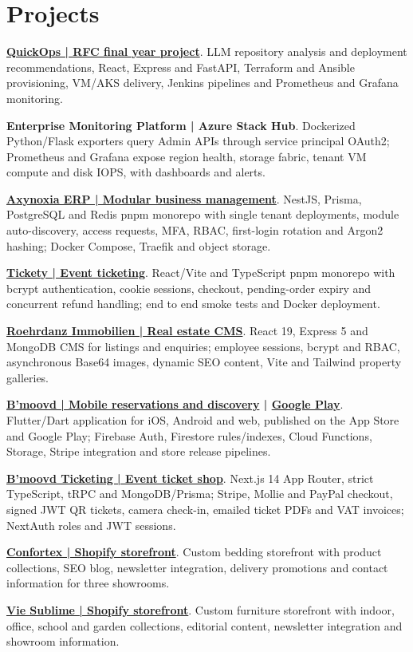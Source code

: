\documentclass[11pt,a4paper]{article}
\newcommand{\project}[2]{\Needspace{3\baselineskip}\textbf{#1}. #2\par}
\begin{document}
\section{Projects}
\project{\href{https://github.com/tamim-hmizi/QuickOps-AI}{QuickOps | RFC final year project}}{LLM repository analysis and deployment recommendations, React, Express and FastAPI, Terraform and Ansible provisioning, VM/AKS delivery, Jenkins pipelines and Prometheus and Grafana monitoring.}
\project{Enterprise Monitoring Platform | Azure Stack Hub}{Dockerized Python/Flask exporters query Admin APIs through service principal OAuth2; Prometheus and Grafana expose region health, storage fabric, tenant VM compute and disk IOPS, with dashboards and alerts.}
\project{\href{https://erp.products.axynoxia.com}{Axynoxia ERP | Modular business management}}{NestJS, Prisma, PostgreSQL and Redis pnpm monorepo with single tenant deployments, module auto-discovery, access requests, MFA, RBAC, first-login rotation and Argon2 hashing; Docker Compose, Traefik and object storage.}
\project{\href{https://tickets.products.axynoxia.com}{Tickety | Event ticketing}}{React/Vite and TypeScript pnpm monorepo with bcrypt authentication, cookie sessions, checkout, pending-order expiry and concurrent refund handling; end to end smoke tests and Docker deployment.}
\project{\href{https://rimmobilien-test.de/}{Roehrdanz Immobilien | Real estate CMS}}{React 19, Express 5 and MongoDB CMS for listings and enquiries; employee sessions, bcrypt and RBAC, asynchronous Base64 images, dynamic SEO content, Vite and Tailwind property galleries.}
\project{\href{https://apps.apple.com/de/app/bmoovd/id6736364332}{B'moovd | Mobile reservations and discovery} | \href{https://play.google.com/store/apps/details?id=com.bmoovd.app}{Google Play}}{Flutter/Dart application for iOS, Android and web, published on the App Store and Google Play; Firebase Auth, Firestore rules/indexes, Cloud Functions, Storage, Stripe integration and store release pipelines.}
\project{\href{https://bmoovd-shop.com}{B'moovd Ticketing | Event ticket shop}}{Next.js 14 App Router, strict TypeScript, tRPC and MongoDB/Prisma; Stripe, Mollie and PayPal checkout, signed JWT QR tickets, camera check-in, emailed ticket PDFs and VAT invoices; NextAuth roles and JWT sessions.}
\project{\href{https://confortex.shop/}{Confortex | Shopify storefront}}{Custom bedding storefront with product collections, SEO blog, newsletter integration, delivery promotions and contact information for three showrooms.}
\project{\href{https://www.viesublime.tn/}{Vie Sublime | Shopify storefront}}{Custom furniture storefront with indoor, office, school and garden collections, editorial content, newsletter integration and showroom information.}
\end{document}
